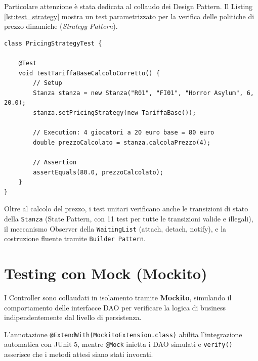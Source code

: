 Particolare attenzione è stata dedicata al collaudo dei Design Pattern. Il Listing \ref{lst:test_strategy} mostra un test parametrizzato per la verifica delle politiche di prezzo dinamiche (\textit{Strategy Pattern}).

\begin{lstlisting}[caption={Unit Test per la logica di calcolo del prezzo (Strategy Pattern)}, label={lst:test_strategy}]
class PricingStrategyTest {

    @Test
    void testTariffaBaseCalcoloCorretto() {
        // Setup
        Stanza stanza = new Stanza("R01", "FI01", "Horror Asylum", 6, 20.0);
        stanza.setPricingStrategy(new TariffaBase());
        
        // Execution: 4 giocatori a 20 euro base = 80 euro
        double prezzoCalcolato = stanza.calcolaPrezzo(4);
        
        // Assertion
        assertEquals(80.0, prezzoCalcolato);
    }
}
\end{lstlisting}

Oltre al calcolo del prezzo, i test unitari verificano anche le transizioni di stato della \texttt{Stanza} (State Pattern, con 11 test per tutte le transizioni valide e illegali), il meccanismo Observer della \texttt{WaitingList} (attach, detach, notify), e la costruzione fluente tramite \texttt{Builder Pattern}.

\section{Testing con Mock (Mockito)}

I Controller sono collaudati in isolamento tramite \textbf{Mockito}, simulando il comportamento delle interfacce DAO per verificare la logica di business indipendentemente dal livello di persistenza.

L'annotazione \texttt{@ExtendWith(MockitoExtension.class)} abilita l'integrazione automatica con JUnit 5, mentre \texttt{@Mock} inietta i DAO simulati e \texttt{verify()} asserisce che i metodi attesi siano stati invocati.

